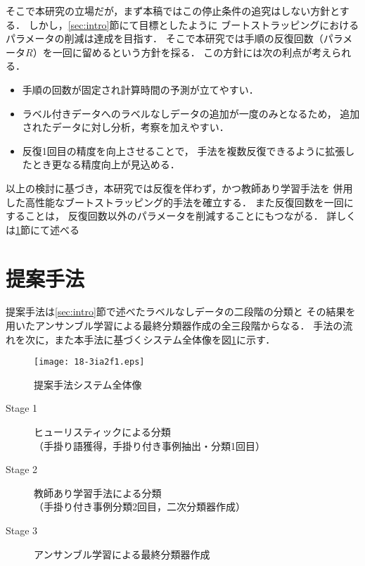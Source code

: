 \documentclass[japanese]{jnlp_1.4}
\begin{document}
そこで本研究の立場だが，まず本稿ではこの停止条件の追究はしない方針とする．
しかし，\ref{sec:intro}節にて目標としたように
ブートストラッピングにおけるパラメータの削減は達成を目指す．
そこで本研究では手順の反復回数（パラメータ$R$）を一回に留めるという方針を採る．
この方針には次の利点が考えられる．

\begin{itemize}
\item 手順の回数が固定され計算時間の予測が立てやすい．
\item ラベル付きデータへのラベルなしデータの追加が一度のみとなるため，
追加されたデータに対し分析，考察を加えやすい．
\item 反復1回目の精度を向上させることで，
手法を複数反復できるように拡張したとき更なる精度向上が見込める．
\end{itemize}

以上の検討に基づき，本研究では反復を伴わず，かつ教師あり学習手法を
併用した高性能なブートストラッピング的手法を確立する．
また反復回数を一回にすることは，
反復回数以外のパラメータを削減することにもつながる．
詳しくは\ref{sec:method}節にて述べる



\section{提案手法}
\label{sec:method}

提案手法は\ref{sec:intro}節で述べたラベルなしデータの二段階の分類と
その結果を用いたアンサンブル学習による最終分類器作成の全三段階からなる．
手法の流れを次に，また本手法に基づくシステム全体像を図\ref{fig:img01}に示す．

\begin{figure}[b]
 \begin{center}
  \texttt{[image: 18-3ia2f1.eps]}
 \end{center}
  \caption{提案手法システム全体像}
  \label{fig:img01}
\end{figure}

\vspace{0.5\baselineskip}
\begin{center}
\begin{minipage}{0.85\hsize}
\begin{description}
\item[Stage 1] ヒューリスティックによる分類\\
（手掛り語獲得，手掛り付き事例抽出・分類1回目）
\item[Stage 2] 教師あり学習手法による分類\\
（手掛り付き事例分類2回目，二次分類器作成）
\item[Stage 3] アンサンブル学習による最終分類器作成
\end{description}
\end{minipage}
\end{center}
\vspace{0.5\baselineskip}
\end{document}
